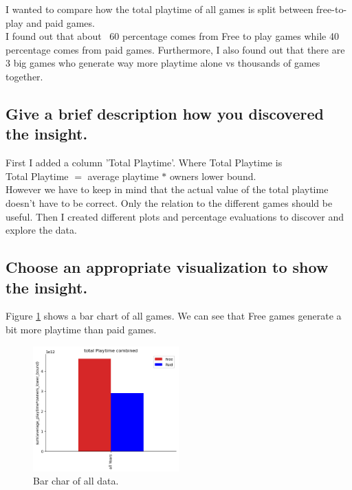 \documentclass[11pt]{article}
\begin{document}
I wanted to compare how the total playtime of all games is split between free-to-play and paid games.\\
I found out that about ~60 percentage comes from Free to play games while 40 percentage comes from paid games. Furthermore, I also found out that there are 3 big games who generate way more playtime alone vs thousands of games together. 

\subsection{Give a brief description how you discovered the
insight.}

First I added a column 'Total Playtime'. Where Total Playtime is \\
Total Playtime $=$ average playtime $*$ owners lower bound.\\
However we have to keep in mind that the actual value of the total playtime doesn't have to be correct. Only the relation to the different games should be useful. 
Then I created different plots and percentage evaluations to discover and explore the data. 

\subsection{Choose an appropriate visualization to show the insight.}

Figure \ref{fig:insight1_1} shows a bar chart of all games. We can see that Free games generate a bit more playtime than paid games.\\ 
\begin{figure}[h]
    \centering
    \includegraphics[width=0.5\textwidth]{graphics/insight1_graph1.png}
    \caption{Bar char of all data.}
    \label{fig:insight1_1}
\end{figure}
\end{document}
